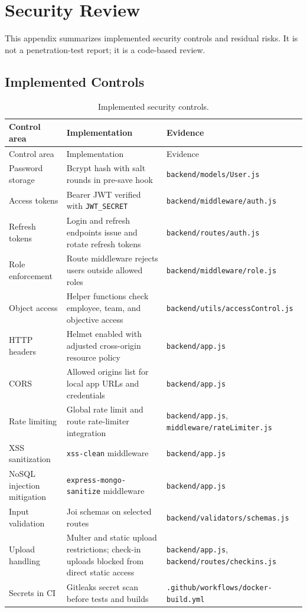 \chapter{Security Review}
This appendix summarizes implemented security controls and residual risks. It is not a penetration-test report; it is a code-based review.

\section{Implemented Controls}
\begin{longtable}{p{}p{}p{}}
\caption{Implemented security controls.}\label{tab:security-controls}\\
\toprule
Control area & Implementation & Evidence\\
\midrule
\endfirsthead
\toprule
Control area & Implementation & Evidence\\
\midrule
\endhead
Password storage & Bcrypt hash with salt rounds in pre-save hook & \texttt{backend/models/User.js}\\
Access tokens & Bearer JWT verified with \texttt{JWT\_SECRET} & \texttt{backend/middleware/auth.js}\\
Refresh tokens & Login and refresh endpoints issue and rotate refresh tokens & \texttt{backend/routes/auth.js}\\
Role enforcement & Route middleware rejects users outside allowed roles & \texttt{backend/middleware/role.js}\\
Object access & Helper functions check employee, team, and objective access & \texttt{backend/utils/accessControl.js}\\
HTTP headers & Helmet enabled with adjusted cross-origin resource policy & \texttt{backend/app.js}\\
CORS & Allowed origins list for local app URLs and credentials & \texttt{backend/app.js}\\
Rate limiting & Global rate limit and route rate-limiter integration & \texttt{backend/app.js}, \texttt{middleware/rateLimiter.js}\\
XSS sanitization & \texttt{xss-clean} middleware & \texttt{backend/app.js}\\
NoSQL injection mitigation & \texttt{express-mongo-sanitize} middleware & \texttt{backend/app.js}\\
Input validation & Joi schemas on selected routes & \texttt{backend/validators/schemas.js}\\
Upload handling & Multer and static upload restrictions; check-in uploads blocked from direct static access & \texttt{backend/app.js}, \texttt{backend/routes/checkins.js}\\
Secrets in CI & Gitleaks secret scan before tests and builds & \texttt{.github/workflows/docker-build.yml}\\
\bottomrule
\end{longtable}

